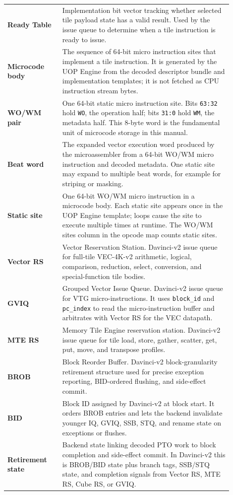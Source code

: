 \begin{longtable}{@{}L{0.22\linewidth}L{0.68\linewidth}@{}}
\textbf{Ready Table} & Implementation bit vector tracking whether selected tile payload state has a valid result. Used by the issue queue to determine when a tile instruction is ready to issue. \\
\textbf{Microcode body} & The sequence of 64-bit micro instruction sites that implement a tile instruction. It is generated by the UOP Engine from the decoded descriptor bundle and implementation templates; it is not fetched as CPU instruction stream bytes. \\
\textbf{WO/WM pair} & One 64-bit static micro instruction site. Bits \texttt{63:32} hold \texttt{WO}, the operation half; bits \texttt{31:0} hold \texttt{WM}, the metadata half. This 8-byte word is the fundamental unit of microcode storage in this manual. \\
\textbf{Beat word} & The expanded vector execution word produced by the microassembler from a 64-bit WO/WM micro instruction and decoded metadata. One static site may expand to multiple beat words, for example for striping or masking. \\
\textbf{Static site} & One 64-bit WO/WM micro instruction in a microcode body. Each static site appears once in the UOP Engine template; loops cause the site to execute multiple times at runtime. The WO/WM sites column in the opcode map counts static sites. \\
\textbf{Vector RS} & Vector Reservation Station. Davinci-v2 issue queue for full-tile VEC-4K-v2 arithmetic, logical, comparison, reduction, select, conversion, and special-function tile bodies. \\
\textbf{GVIQ} & Grouped Vector Issue Queue. Davinci-v2 issue queue for VTG micro-instructions. It uses \texttt{block\_id} and \texttt{pc\_index} to read the micro-instruction buffer and arbitrates with Vector RS for the VEC datapath. \\
\textbf{MTE RS} & Memory Tile Engine reservation station. Davinci-v2 issue queue for tile load, store, gather, scatter, get, put, move, and transpose profiles. \\
\textbf{BROB} & Block Reorder Buffer. Davinci-v2 block-granularity retirement structure used for precise exception reporting, BID-ordered flushing, and side-effect commit. \\
\textbf{BID} & Block ID assigned by Davinci-v2 at block start. It orders BROB entries and lets the backend invalidate younger IQ, GVIQ, SSB, STQ, and rename state on exceptions or flushes. \\
\textbf{Retirement state} & Backend state linking decoded PTO work to block completion and side-effect commit. In Davinci-v2 this is BROB/BID state plus branch tags, SSB/STQ state, and completion signals from Vector RS, MTE RS, Cube RS, or GVIQ. \\

\end{longtable}

